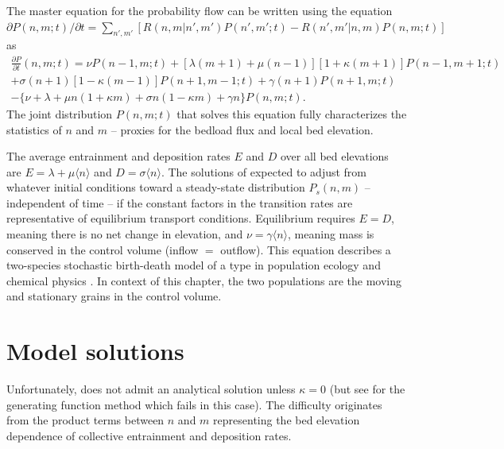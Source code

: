 The master equation for the probability flow can be written using the \DIFdelbegin {}\DIFdelend \DIFaddbegin {}\DIFaddend equation
 $\partial P(n,m;t)/\partial t = 
\sum_{n',m'} [R(n,m|n',m')P(n',m';t)-R(n',m'|n,m)P(n,m;t)]$ \citep{Cox1965, Gillespie1991, Ancey2008} as 
\begin{multline}
	\frac{\partial P}{\partial t}(n,m;t) =  
	\nu P(n-1,m;t) + [\lambda(m+1) + \mu(n-1)][1+\kappa(m+1)]P(n-1,m+1;t)\\  
	+ \sigma(n+1)[1-\kappa(m-1)]P(n+1,m-1;t) + \gamma(n+1) P(n+1,m;t) \\
	- 
	\{ \nu + \lambda+ \mu n (1+\kappa m) +  \sigma n ( 1- \kappa m) + \gamma n \}P(n,m;t).
	\label{eq:elemaster}
\end{multline}
The joint distribution $P(n,m;t)$ that solves this equation fully characterizes the statistics of $n$ and $m$ -- proxies for the bedload flux and local bed elevation.

The average entrainment and deposition rates $E$ and $D$ over all bed elevations are $E = \lambda +\mu \langle n \rangle$ and $D=\sigma \langle n \rangle$.
The solutions of \DIFdelbegin {}\DIFdelend \DIFaddbegin {}\DIFaddend expected to adjust from whatever initial conditions toward a steady-state distribution $P_s(n,m)$ -- independent of time -- if the constant factors in the transition rates are representative of equilibrium transport conditions.
Equilibrium requires $E=D$, meaning there is no net change in elevation, and $\nu = \gamma \langle n \rangle$, meaning mass is conserved in the control volume (inflow $=$ outflow).
This \DIFdelbegin {}\DIFdelend \DIFaddbegin {}\DIFaddend equation describes a two-species stochastic birth-death model \citep{Cox1965} of a type \DIFdelbegin {}\DIFdelend \DIFaddbegin {}\DIFaddend in population ecology \citep{Pielou1977, Swift2002} and chemical physics \citep{Gardiner1983}.
In context of this chapter, the two populations are the moving and stationary grains in the control volume.

\section{Model solutions}
\label{sec:elesolution}

Unfortunately, \DIFdelbegin {}\DIFdelend \DIFaddbegin {}\DIFaddend does not admit an analytical solution unless $\kappa=0$ (but see \citet{Swift2002} for the generating function method which fails in this case).
The difficulty originates from the product terms between $n$ and $m$ representing the bed elevation dependence of collective entrainment and deposition rates.

